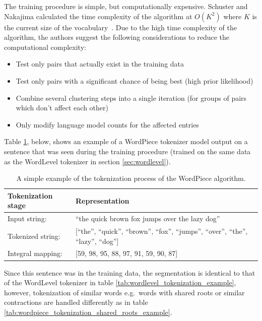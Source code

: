 \documentclass[12pt]{article}
\begin{document}
\noindent
The training procedure is simple, but computationally expensive. Schuster and Nakajima calculated the time complexity of the algorithm at $O(K^2)$
where $K$ is the current size of the vocabulary~\cite{schuster_japanese_2012}. Due to the high time complexity of the algorithm, the authors suggest
the following considerations to reduce the computational complexity:

\begin{itemize}
    \item Test only pairs that actually exist in the training data
    \item Test only pairs with a significant chance of being best (high prior likelihood)
    \item Combine several clustering steps into a single iteration (for groups of pairs which don't affect each other)
    \item Only modify language model counts for the affected entries
\end{itemize}

Table \ref{tab:wordpiece_tokenization_example}, below, shows an example of a WordPiece tokenizer model output on a sentence that was seen during the
training procedure (trained on the same data as the WordLevel tokenizer in section \ref{sec:wordlevel}).

\begin{table}[h!]
    \centering
    \begin{tabular}{l l}
        \toprule
        Tokenization stage & Representation                                                                            \\
        \midrule
        Input string:      & ``the quick brown fox jumps over the lazy dog''                                           \\
        Tokenized string:  & [``the'', ``quick'', ``brown'', ``fox'', ``jumps'', ``over'', ``the'', ``lazy'', ``dog''] \\
        Integral mapping:  & [59, 98, 95, 88, 97, 91, 59, 90, 87]                                                      \\
        \bottomrule
    \end{tabular}
    \caption{A simple example of the tokenization process of the WordPiece algorithm.}
    \label{tab:wordpiece_tokenization_example}
\end{table}

\noindent
Since this sentence was in the training data, the segmentation is identical to that of the WordLevel tokenizer in table
\ref{tab:wordlevel_tokenization_example}, however, tokenization of similar words e.g.~words with shared roots or similar contractions are handled
differently as in table \ref{tab:wordpiece_tokenization_shared_roots_example}.
\end{document}
